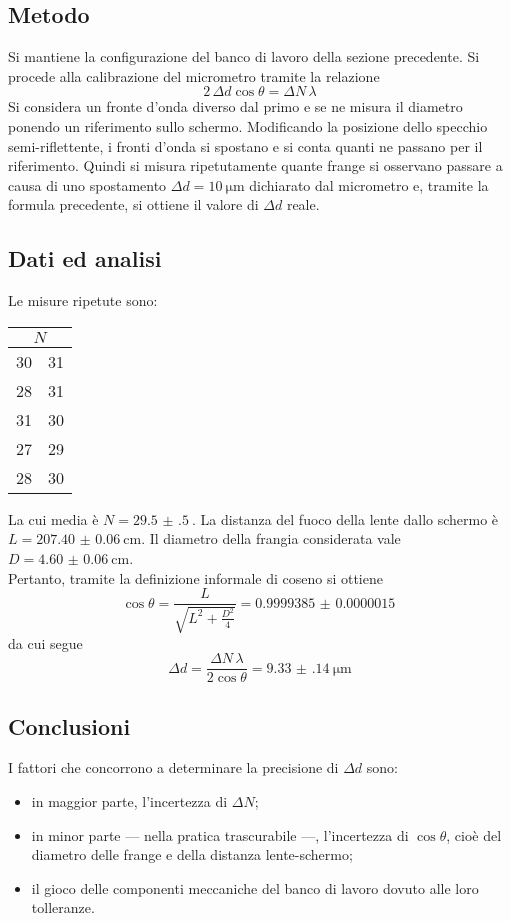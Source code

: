 \documentclass[a4paper]{article}
\begin{document}
\subsection{Metodo}
Si mantiene la configurazione del banco di lavoro della sezione precedente. Si procede alla calibrazione del micrometro tramite la relazione
\[
2\,\Delta d\cos\theta = \Delta N\,\lambda
\]
Si considera un fronte d'onda diverso dal primo e se ne misura il diametro ponendo un riferimento sullo schermo. Modificando la posizione dello specchio semi-riflettente, i fronti d'onda si spostano e si conta quanti ne passano per il riferimento. Quindi si misura ripetutamente quante frange si osservano passare a causa di uno spostamento $\Delta d=\SI{10}{\micro\m}$ dichiarato dal micrometro e, tramite la formula precedente, si ottiene il valore di $\Delta d $ reale.

\subsection{Dati ed analisi}
Le misure ripetute sono:
\begin{center}
\begin{tabular}[h]{c|c}
	\multicolumn{2}{c}{$N$} \\\midrule
	\SI{30}{} & \SI{31}{} \\
	\SI{28}{} & \SI{31}{} \\
    	\SI{31}{} & \SI{30}{} \\
    	\SI{27}{} & \SI{29}{} \\
    	\SI{28}{} & \SI{30}{} \\
\end{tabular}
\end{center}
La cui media è $N=\SI{29.5(5)}{}$. La distanza del fuoco della lente dallo schermo è $L=\SI{207.40(6)}{\cm}$. Il diametro della frangia considerata vale $D=\SI{4.60(6)}{\cm}$.\\
Pertanto, tramite la definizione informale di coseno si ottiene
\[
\cos \theta= \frac{L}{\sqrt{L^2+\frac{D^2}{4}} }=\SI{0.9999385(15)}{}
\] 
da cui segue
\[
\Delta d = \frac{\Delta N\,\lambda}{2 \cos \theta}=\SI{9.33(14)}{\micro\m}
\] 

\subsection{Conclusioni}
I fattori che concorrono a determinare la precisione di $ \Delta d $ sono: 
\begin{itemize}
    \item in maggior parte, l'incertezza di $\Delta N$;
    \item in minor parte --- nella pratica trascurabile ---, l'incertezza di $\cos \theta$, cioè del diametro delle frange e della distanza lente-schermo;
    \item il gioco delle componenti meccaniche del banco di lavoro dovuto alle loro tolleranze.
\end{itemize}
\end{document}
